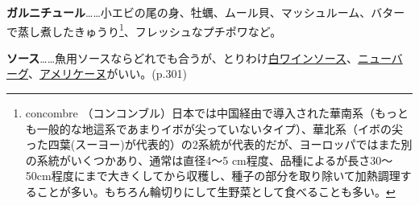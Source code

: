 \textbf{ガルニチュール}\ldots{}\ldots{}小エビの尾の身、牡蠣、ムール貝、マッシュルーム、バターで蒸し煮したきゅうり\footnote{concombre
  （コンコンブル）日本では中国経由で導入された華南系（もっとも一般的な地這系であまりイボが尖っていないタイプ）、華北系（イボの尖った四葉(スーヨー)が代表的）の2系統が代表的だが、ヨーロッパではまた別の系統がいくつかあり、通常は直径4〜5
  cm程度、品種によるが長さ30〜50cm程度にまで大きくしてから収穫し、種子の部分を取り除いて加熱調理することが多い。もちろん輪切りにして生野菜として食べることも多い。}、フレッシュなプチポワなど。

\textbf{ソース}\ldots{}\ldots{}魚用ソースならどれでも合うが、とりわけ\protect\hyperlink{sauce-vin-blanc}{白ワインソース}、\protect\hyperlink{sauce-a-la-new-berg-cru}{ニューバーグ}、\protect\hyperlink{sauce-americaine}{アメリケーヌ}がいい。(p.301)

